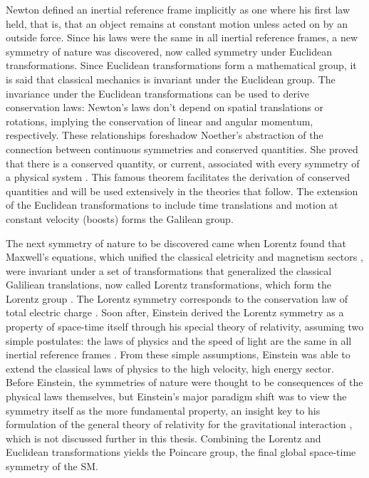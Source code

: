 \indent Newton defined an inertial reference frame implicitly as one where his first law held, that is, that an object remains at constant motion unless acted on by an outside force. Since his laws were the same in all inertial reference frames, a new symmetry of nature was discovered, now called symmetry under Euclidean transformations. Since Euclidean transformations form a mathematical group, it is said that classical mechanics is invariant under the Euclidean group. The invariance under the Euclidean transformations can be used to derive conservation laws: Newton's laws don't depend on spatial translations or rotations, implying the conservation of linear and angular momentum, respectively. These relationships foreshadow Noether's abstraction of the connection between continuous symmetries and conserved quantities. She proved that there is a conserved quantity, or current, associated with every symmetry of a physical system \cite{Noether:1918zz}. This famous theorem facilitates the derivation of conserved quantities and will be used extensively in the theories that follow. The extension of the Euclidean transformations to include time translations and motion at constant velocity (boosts) forms the Galilean group.

\indent The next symmetry of nature to be discovered came when Lorentz found that \\
Maxwell's equations, which unified the classical eletricity and magnetism sectors \cite{Maxwell01011865}, were invariant under a set of transformations that generalized the classical Galiliean translations, now called Lorentz transformations, which form the Lorentz group \cite{Lorentz}. The Lorentz symmetry corresponds to the conservation law of total electric charge \cite{Noether:1918zz2}. Soon after, Einstein derived the Lorentz symmetry as a property of space-time itself through his special theory of relativity, assuming two simple postulates: the laws of physics and the speed of light are the same in all inertial reference frames \cite{Einstein:1905ve}. From these simple assumptions, Einstein was able to extend the classical laws of physics to the high velocity, high energy sector. Before Einstein, the symmetries of nature were thought to be consequences of the physical laws themselves, but Einstein's major paradigm shift was to view the symmetry itself as the more fundamental property, an insight key to his formulation of the general theory of relativity for the gravitational interaction \cite{Einstein:1914bt}, which is not discussed further in this thesis. Combining the Lorentz and Euclidean transformations yields the Poincare group, the final global space-time symmetry of the SM.

